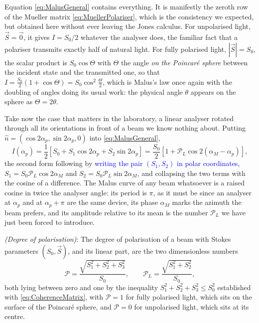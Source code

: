             Equation \ref{eq:MalusGeneral} contains everything. It is manifestly the zeroth row of the Mueller matrix \ref{eq:MuellerPolariser}, which is the consistency we expected, but obtained here without ever leaving the Jones calculus. For unpolarised light, $\vec{S}=\vec{0}$, it gives $I=S_0/2$ whatever the analyser does, the familiar fact that a polariser transmits exactly half of natural light. For fully polarised light, $\left|\vec{S}\right|=S_0$, the scalar product is $S_0\cos\Theta$ with $\Theta$ the angle \textit{on the Poincaré sphere} between the incident state and the transmitted one, so that $I=\frac{S_0}{2}(1+\cos\Theta)=S_0\cos^2\frac{\Theta}{2}$, which is Malus's law once again with the doubling of angles doing its usual work: the physical angle $\theta$ appears on the sphere as $\Theta=2\theta$.

            Take now the case that matters in the laboratory, a linear analyser rotated through all its orientations in front of a beam we know nothing about. Putting $\hat{n}=\left(\cos2\alpha_p,\sin2\alpha_p,0\right)$ into \ref{eq:MalusGeneral},
            \begin{equation}\label{eq:MalusScan}
                I\left(\alpha_p\right) = \frac{1}{2}\left[S_0+S_1\cos2\alpha_p+S_2\sin2\alpha_p\right] = \frac{S_0}{2}\left[1+\mathcal{P}_L\cos2\left(\alpha_M-\alpha_p\right)\right],
            \end{equation}
            the second form following by \textcolor{blue}{writing the pair $(S_1,S_2)$ in polar coordinates}, $S_1=S_0\mathcal{P}_L\cos2\alpha_M$ and $S_2=S_0\mathcal{P}_L\sin2\alpha_M$, and collapsing the two terms with the cosine of a difference. The Malus curve of any beam whatsoever is a raised cosine in twice the analyser angle: its period is $\pi$, as it must be since an analyser at $\alpha_p$ and at $\alpha_p+\pi$ are the same device, its phase $\alpha_M$ marks the azimuth the beam prefers, and its amplitude relative to its mean is the number $\mathcal{P}_L$ we have just been forced to introduce.

            \begin{myDef}
                \textit{(Degree of polarisation)}: The degree of polarisation of a beam with Stokes parameters $\left(S_0,\vec{S}\right)$, and its linear part, are the two dimensionless numbers
                \begin{equation}\label{eq:DegreePolarisation}
                    \mathcal{P} = \frac{\sqrt{S_1^2+S_2^2+S_3^2}}{S_0}, \qquad \mathcal{P}_L = \frac{\sqrt{S_1^2+S_2^2}}{S_0},
                \end{equation}
                both lying between zero and one by the inequality $S_1^2+S_2^2+S_3^2\leq S_0^2$ established with \ref{eq:CoherenceMatrix}, with $\mathcal{P}=1$ for fully polarised light, which sits on the surface of the Poincaré sphere, and $\mathcal{P}=0$ for unpolarised light, which sits at its centre.
            \end{myDef}

